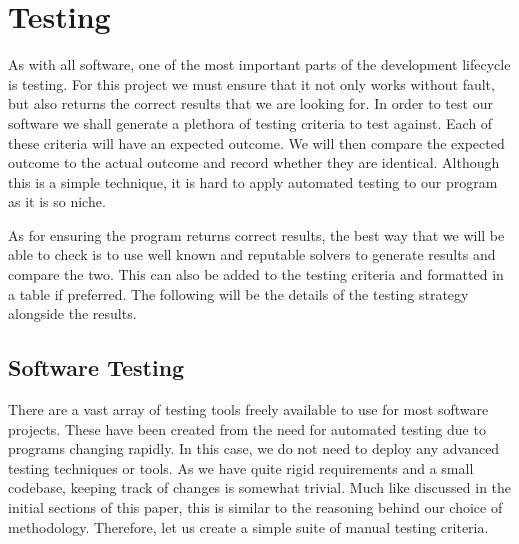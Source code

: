\documentclass{article}
\begin{document}
\section{Testing}
As with all software, one of the most important parts of the development lifecycle is testing. For
this project we must ensure that it not only works without fault, but also returns the correct
results that we are looking for. In order to test our software we shall generate a plethora of
testing criteria to test against. Each of these criteria will have an expected outcome. We will then
compare the expected outcome to the actual outcome and record whether they are identical. Although
this is a simple technique, it is hard to apply automated testing to our program as it is so niche.

As for ensuring the program returns correct results, the best way that we will be able to check is
to use well known and reputable solvers to generate results and compare the two. This can also be
added to the testing criteria and formatted in a table if preferred. The following will be the
details of the testing strategy alongside the results.

\subsection{Software Testing}
There are a vast array of testing tools freely available to use for most software projects. These
have been created from the need for automated testing due to programs changing rapidly. In this
case, we do not need to deploy any advanced testing techniques or tools. As we have quite rigid
requirements and a small codebase, keeping track of changes is somewhat trivial. Much like discussed
in the initial sections of this paper, this is similar to the reasoning behind our choice of
methodology. Therefore, let us create a simple suite of manual testing criteria.
\end{document}
